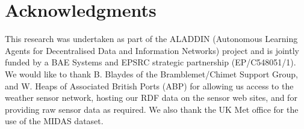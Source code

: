 \documentclass{acmtrans2m}
\begin{document}
\section*{Acknowledgments}

\noindent This research was undertaken as part of the ALADDIN (Autonomous Learning Agents for Decentralised Data and Information Networks) project and is jointly funded by a BAE Systems and EPSRC strategic partnership (EP/C548051/1). We would like to thank B. Blaydes of the Bramblemet/Chimet Support Group, and W. Heaps of Associated British Ports (ABP) for allowing us access to the weather sensor network, hosting our RDF data on the sensor web sites, and for providing raw sensor data as required. We also thank the UK Met office for the use of
the MIDAS dataset.

 


\end{document}
